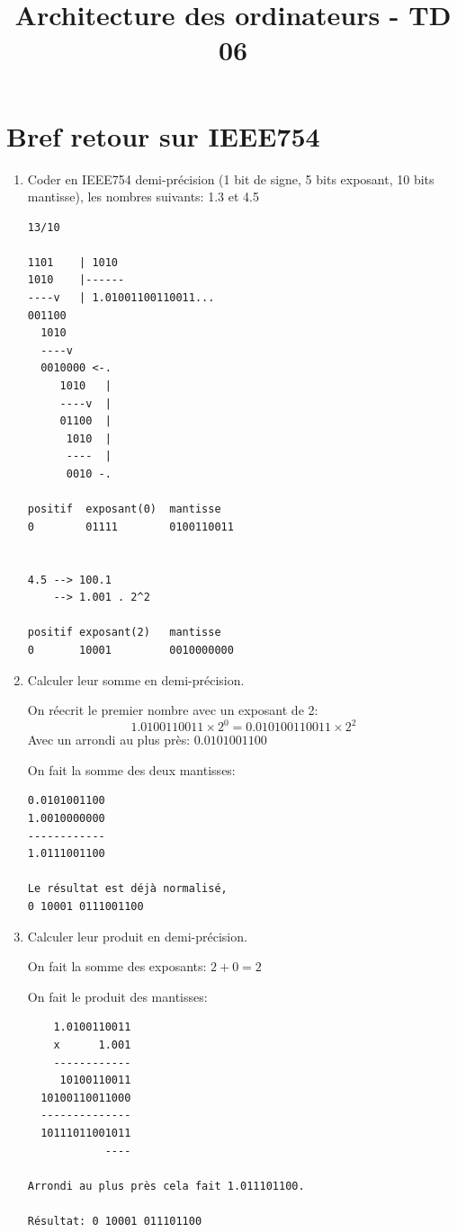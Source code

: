 \documentclass[a4paper,10pt]{exam}
\title{Architecture des ordinateurs - TD 06}
\author{}
\date{}
\begin{document}
\maketitle

\section{Bref retour sur IEEE754}
\begin{enumerate}
  \item Coder en IEEE754 demi-précision (1 bit de signe, 5 bits exposant, 10
    bits mantisse), les nombres suivants: 1.3 et 4.5
    \begin{solution}
      \begin{verbatim}
13/10

1101    | 1010
1010    |------
----v   | 1.01001100110011...
001100
  1010
  ----v
  0010000 <-.
     1010   |
     ----v  |
     01100  |
      1010  |
      ----  |
      0010 -.

positif  exposant(0)  mantisse
0        01111        0100110011


4.5 --> 100.1
    --> 1.001 . 2^2

positif exposant(2)   mantisse
0       10001         0010000000
      \end{verbatim}
    \end{solution}
  \item Calculer leur somme en demi-précision.
    \begin{solution}
      On réecrit le premier nombre avec un exposant de 2:
      $$1.0100110011 \times 2^{0} = 0.010100110011 \times 2^{2}$$
      Avec un arrondi au plus près:
      $0.0101001100$

      On fait la somme des deux mantisses:
\begin{verbatim}
0.0101001100
1.0010000000
------------
1.0111001100

Le résultat est déjà normalisé,
0 10001 0111001100
\end{verbatim}
    \end{solution}
  \item Calculer leur produit en demi-précision.
    \begin{solution}
      On fait la somme des exposants:
      $2+0 = 2$

      On fait le produit des mantisses:
\begin{verbatim}
    1.0100110011
    x      1.001
    ------------
     10100110011
  10100110011000
  --------------
  10111011001011
            ----

Arrondi au plus près cela fait 1.011101100.

Résultat: 0 10001 011101100
\end{verbatim}
    \end{solution}
\end{enumerate}
\end{document}
